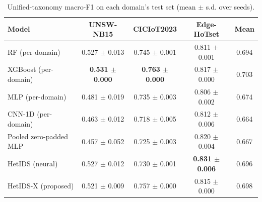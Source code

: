 \begin{table}[htbp]\centering\scriptsize
\caption{Unified-taxonomy macro-F1 on each domain's test set (mean $\pm$ s.d. over seeds).}
\label{tab:main}
\begin{tabular}{lcccc}
\toprule
Model & UNSW-NB15 & CICIoT2023 & Edge-IIoTset & Mean \\
\midrule
RF (per-domain) & 0.527 $\pm$ 0.013 & 0.745 $\pm$ 0.001 & 0.811 $\pm$ 0.001 & 0.694 \\
XGBoost (per-domain) & \textbf{0.531 $\pm$ 0.000} & \textbf{0.763 $\pm$ 0.000} & 0.817 $\pm$ 0.000 & 0.703 \\
MLP (per-domain) & 0.481 $\pm$ 0.019 & 0.735 $\pm$ 0.003 & 0.806 $\pm$ 0.002 & 0.674 \\
CNN-1D (per-domain) & 0.463 $\pm$ 0.012 & 0.718 $\pm$ 0.005 & 0.812 $\pm$ 0.006 & 0.664 \\
Pooled zero-padded MLP & 0.457 $\pm$ 0.052 & 0.725 $\pm$ 0.003 & 0.820 $\pm$ 0.004 & 0.667 \\
HetIDS (neural) & 0.527 $\pm$ 0.012 & 0.730 $\pm$ 0.001 & \textbf{0.831 $\pm$ 0.006} & 0.696 \\
HetIDS-X (proposed) & 0.521 $\pm$ 0.009 & 0.757 $\pm$ 0.000 & 0.815 $\pm$ 0.000 & 0.698 \\
\bottomrule
\end{tabular}
\end{table}